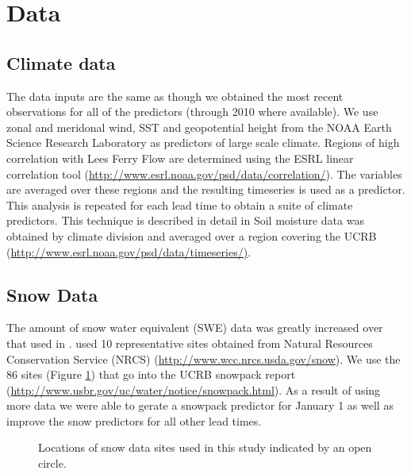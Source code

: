 \documentclass[final,5p,times,twocolumn,authoryear]{elsarticle}
\begin{document}
\section{Data}

\subsection{Climate data}
The data inputs are the same as \citep{Bracken:2010cw} though we obtained the most recent observations for all of the predictors (through 2010 where available).  We use zonal and meridonal wind, SST and geopotential height from the NOAA Earth Science Research Laboratory as predictors of large scale climate.  Regions of high correlation with Lees Ferry Flow are determined using the ESRL linear correlation tool (\url{http://www.esrl.noaa.gov/psd/data/correlation/}). The variables are averaged over these regions and the resulting timeseries is used as a predictor.  This analysis is repeated for each lead time to obtain a suite of climate predictors.  This technique is described in detail in \cite{Grantz:2005ve}  Soil moisture data was obtained by climate division and averaged over a region covering the UCRB (\url{http://www.esrl.noaa.gov/psd/data/timeseries/)}.   

\subsection{Snow Data}
The amount of snow water equivalent (SWE) data was greatly increased over that used in \cite{Bracken:2010cw}. \cite{Bracken:2010cw} used 10 representative sites  obtained from Natural Resources Conservation Service (NRCS) (\url{http://www.wcc.nrcs.usda.gov/snow}). We use the 86 sites (Figure \ref{fig:map-snow}) that go into the UCRB snowpack report (\url{http://www.usbr.gov/uc/water/notice/snowpack.html}).  As a result of using more data we were able to gerate a snowpack predictor for January 1 as well as improve the snow predictors for all other lead times. 


\begin{figure}[htbp] %
   \centering
   
   \caption{Locations of snow data sites used in this study indicated by an open circle.}
   \label{fig:map-snow}
\end{figure}
\end{document}
